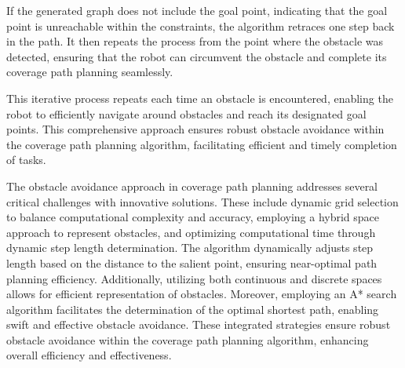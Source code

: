 If the generated graph does not include the goal point, indicating that the goal point is unreachable within the constraints, the algorithm retraces one step back in the path. It then repeats the process from the point where the obstacle was detected, ensuring that the robot can circumvent the obstacle and complete its coverage path planning seamlessly.

\vspace*{6mm}  

This iterative process repeats each time an obstacle is encountered, enabling the robot to efficiently navigate around obstacles and reach its designated goal points. This comprehensive approach ensures robust obstacle avoidance within the coverage path planning algorithm, facilitating efficient and timely completion of tasks.

\vspace*{6mm}  




The obstacle avoidance approach in coverage path planning addresses several critical challenges with innovative solutions. These include dynamic grid selection to balance computational complexity and accuracy, employing a hybrid space approach to represent obstacles, and optimizing computational time through dynamic step length determination. The algorithm dynamically adjusts step length based on the distance to the salient point, ensuring near-optimal path planning efficiency. Additionally, utilizing both continuous and discrete spaces allows for efficient representation of obstacles. Moreover, employing an A* search algorithm facilitates the determination of the optimal shortest path, enabling swift and effective obstacle avoidance. These integrated strategies ensure robust obstacle avoidance within the coverage path planning algorithm, enhancing overall efficiency and effectiveness.


\vspace*{6mm}  
